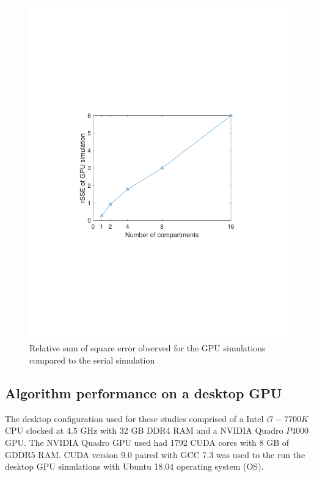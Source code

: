 \documentclass[preprint,10pt,authoryear,review]{elsarticle}
\begin{document}
\begin{figure}[h]
\centering
\includegraphics[scale=0.7]{gpu_error.pdf}
\caption{Relative sum of square error observed for the GPU simulations compared to 
the serial simulation}
\label{fig:res_gpu_error}
\end{figure}


\subsection{Algorithm performance on a desktop GPU}
The desktop configuration used for these studies comprised of a Intel $i7-7700K$  
CPU clocked at $4.5$ GHz with $32$ GB DDR4 RAM and a NVIDIA Quadro $P4000$ GPU. 
The NVIDIA Quadro GPU used had 1792 CUDA cores with 8 GB of GDDR5 RAM. 
CUDA version 9.0 paired with GCC 7.3 was used to the run the desktop GPU simulations 
with Ubuntu 18.04 operating system (OS).



\end{document}
